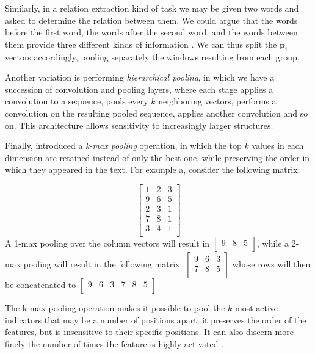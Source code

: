 \documentclass[jair,twoside,11pt,theapa]{article}
\newcommand{\m}[1]{\mathbf{#1}}%
\newcommand{\ygcomment}[1]{\textbf{[TODO: #1]}}
\renewcommand{\ygcomment}[1]{}
\begin{document}
{Similarly, in a relation extraction kind of task we may be given two words and
asked to determine the relation between them. We could argue that the words
before the first word, the words after the second word, and the words between
them provide three different kinds of information \cite{chen2015event}.  We can thus
split the $\m{p_i}$ vectors accordingly, pooling separately the windows
resulting from each group.

Another variation is performing \emph{hierarchical pooling}, in which we have a
succession of convolution and pooling layers, where each stage applies a
convolution to a sequence, pools every $k$ neighboring vectors, performs a
convolution on the resulting pooled sequence, applies another convolution and so
on. This architecture allows sensitivity to increasingly larger structures. 
\ygcomment{Figure?}

Finally, \cite{kalchbrenner2014convolutional} introduced a \emph{k-max pooling}
operation, in which the top $k$ values in each dimension are retained instead of
only the best one, while preserving the order in which they appeared in the
text.
For example a, consider the following matrix:

\[
\begin{bmatrix}
1 & 2 & 3 \\
9 & 6 & 5 \\
2 & 3 & 1 \\
7 & 8 & 1 \\
3 & 4 & 1 \\
\end{bmatrix}
\]
\noindent A 1-max pooling over the column vectors will result in
$
\begin{bmatrix}9 & 8 & 5\\
\end{bmatrix}
$, while a 2-max pooling will result in
    the following matrix:
$
\begin{bmatrix}
9 & 6 & 3 \\
7 & 8 & 5 \\
\end{bmatrix}
$ whose rows will then be concatenated to $
\begin{bmatrix}
    9 & 6 & 3 & 7 & 8 & 5\\
\end{bmatrix}
$

The k-max pooling operation makes it possible
to pool the $k$ most active indicators that may be
a number of positions apart; it preserves the order
of the features, but is insensitive to their specific
positions. It can also discern more finely the number
of times the feature is highly activated \cite{kalchbrenner2014convolutional}.

}
\end{document}
